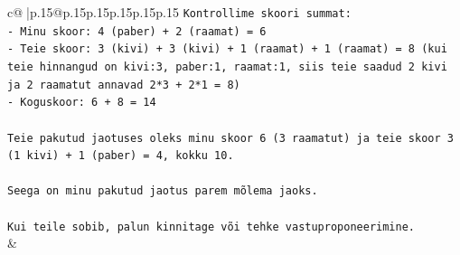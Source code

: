 \documentclass{article}
\begin{document}
{\begin{supertabular}{c@{$\;$}|p{.15\linewidth}@{}p{.15\linewidth}p{.15\linewidth}p{.15\linewidth}p{.15\linewidth}p{.15\linewidth}}
{{{\texttt{Kontrollime skoori summat:} \\
\texttt{{-} Minu skoor: 4 (paber) + 2 (raamat) = 6} \\
\texttt{{-} Teie skoor: 3 (kivi) + 3 (kivi) + 1 (raamat) + 1 (raamat) = 8 (kui teie hinnangud on kivi:3, paber:1, raamat:1, siis teie saadud 2 kivi ja 2 raamatut annavad 2*3 + 2*1 = 8)} \\
\texttt{{-} Koguskoor: 6 + 8 = 14} \\
\\ 
\texttt{Teie pakutud jaotuses oleks minu skoor 6 (3 raamatut) ja teie skoor 3 (1 kivi) + 1 (paber) = 4, kokku 10.} \\
\\ 
\texttt{Seega on minu pakutud jaotus parem mõlema jaoks.} \\
\\ 
\texttt{Kui teile sobib, palun kinnitage või tehke vastuproponeerimine.} \\
            }
        }
    }
    & \\ \\


\end{supertabular}}
\end{document}
